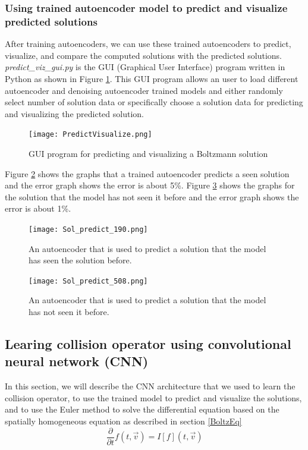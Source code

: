 \documentclass{article}
\begin{document}
\subsubsection{Using trained autoencoder model to predict and visualize predicted solutions} \label{ae_visulize}
After training autoencoders, we can use these trained autoencoders to predict, visualize, and compare the computed solutions with the predicted solutions. \emph{predict\_viz\_gui.py} is the GUI (Graphical User Interface) program written in Python as shown in Figure \ref{fig:PredictVisualize1}. This GUI program allows an user to load different autoencoder and denoising autoencoder trained models and either randomly select number of solution data or specifically choose a solution data for predicting and visualizing the predicted solution. 
\begin{figure}[h!]
	\centering
	\texttt{[image: PredictVisualize.png]}
	\caption{GUI program for predicting and visualizing a Boltzmann solution}
	\label{fig:PredictVisualize1}
\end{figure}

Figure \ref{fig:Sol190} shows the graphs that a trained autoencoder predicts a seen solution and the error graph shows the error is about 5\%. Figure \ref{fig:Sol508} shows the graphs for the solution that the model has not seen it before and the error graph shows the error is about 1\%.

\begin{figure}[h]
	\centering
	\texttt{[image: Sol\_predict\_190.png]}
	\caption{An autoencoder that is used to predict a solution that the model has seen the solution before.}
	\label{fig:Sol190}
\end{figure}

\begin{figure}[h]
	\centering
	\texttt{[image: Sol\_predict\_508.png]}
	\caption{An autoencoder that is used to predict a solution that the model has not seen it before.}
	\label{fig:Sol508}
\end{figure}

\subsection{Learing collision operator using convolutional neural network (CNN)}
In this section, we will describe the CNN architecture that we used to learn the collision operator, to use the trained model to predict and visualize the solutions, and to use the Euler method to solve the differential equation based on the spatially homogeneous equation as described in section \ref{BoltzEq}
\begin{equation}
\frac{\partial}{\partial t}f(t,\vec{v}) = I[f](t, \vec{v})
\end{equation}
\end{document}
